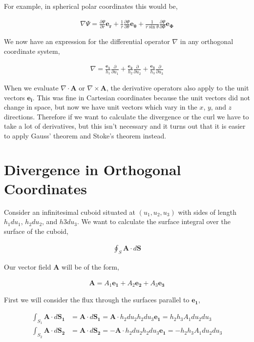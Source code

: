 \documentclass[11pt]{amsart}
\begin{document}
For example, in spherical polar coordinates this would be,

\begin{align*}
  \nabla\Psi = \frac{\partial\Psi}{\partial r} \mathbf{e_r} + \frac{1}{r}\frac{\partial\Psi}{\partial\theta}\mathbf{e_{\theta}} + \frac{1}{r\sin\theta}\frac{\partial\Psi}{\partial\Phi}\mathbf{e_{\Phi}}
\end{align*}

We now have an expression for the differential operator $\nabla$ in any orthogonal coordinate system,

\begin{align*}
  \nabla = \frac{\mathbf{e_1}}{h_1}\frac{\partial}{\partial u_1} + \frac{\mathbf{e_2}}{h_2}\frac{\partial}{\partial u_2} + \frac{\mathbf{e_3}}{h_3}\frac{\partial}{\partial u_3}
\end{align*}

When we evaluate $\nabla\cdot\mathbf{A}$ or $\nabla\times\mathbf{A}$, the derivative operators also apply to the unit vectors $\mathbf{e_i}$. This was fine in Cartesian coordinates because the unit vectors did not change in space, but now we have unit vectors which vary in the $x$, $y$, and $z$ directions. Therefore if we want to calculate the divergence or the curl we have to take a lot of derivatives, but this isn't necessary and it turns out that it is easier to apply Gauss' theorem and Stoke's theorem instead.

\section{Divergence in Orthogonal Coordinates}

Consider an infinitesimal cuboid situated at $(u_1, u_2, u_3)$ with sides of length $h_1 du_1$, $h_2 du_2$, and $h3 du_3$. We want to calculate the surface integral over the surface of the cuboid,

\begin{align*}
  \oint_S \mathbf{A}\cdot d\mathbf{S}
\end{align*}

Our vector field $\mathbf{A}$ will be of the form,

\begin{align*}
  \mathbf{A} = A_1 \mathbf{e_1} + A_2 \mathbf{e_2} + A_3 \mathbf{e_3}
\end{align*}

First we will consider the flux through the surfaces parallel to $\mathbf{e_1}$,

\begin{align*}
  \int_{S_1} \mathbf{A}\cdot d\mathbf{S_1} &= \mathbf{A}\cdot d\mathbf{S_1} = \mathbf{A}\cdot h_2 du_2 h_2 du_3 \mathbf{e_1} = h_2 h_3 A_1 du_2 du_3 \\
  \int_{S_2} \mathbf{A}\cdot d\mathbf{S_2} &= \mathbf{A}\cdot d\mathbf{S_2} = -\mathbf{A}\cdot h_2 du_2 h_2 du_3 \mathbf{e_1} = -h_2 h_3 A_1 du_2 du_3
\end{align*}
\end{document}
